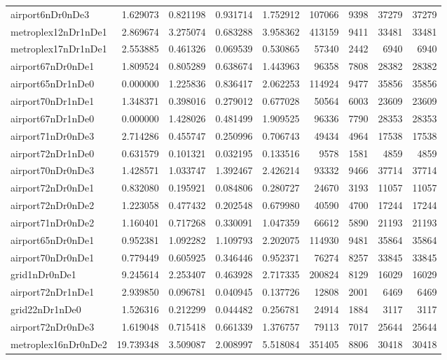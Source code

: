 \begin{longtable}{|l|r|r|r|r|r|r|r|r|}
airport6nDr0nDe3 & 1.629073 & 0.821198 & 0.931714 & 1.752912 & 107066 & 9398 & 37279 & 37279 \\
metroplex12nDr1nDe1 & 2.869674 & 3.275074 & 0.683288 & 3.958362 & 413159 & 9411 & 33481 & 33481 \\
metroplex17nDr1nDe1 & 2.553885 & 0.461326 & 0.069539 & 0.530865 & 57340 & 2442 & 6940 & 6940 \\
airport67nDr0nDe1 & 1.809524 & 0.805289 & 0.638674 & 1.443963 & 96358 & 7808 & 28382 & 28382 \\
airport65nDr1nDe0 & 0.000000 & 1.225836 & 0.836417 & 2.062253 & 114924 & 9477 & 35856 & 35856 \\
airport70nDr1nDe1 & 1.348371 & 0.398016 & 0.279012 & 0.677028 & 50564 & 6003 & 23609 & 23609 \\
airport67nDr1nDe0 & 0.000000 & 1.428026 & 0.481499 & 1.909525 & 96336 & 7790 & 28353 & 28353 \\
airport71nDr0nDe3 & 2.714286 & 0.455747 & 0.250996 & 0.706743 & 49434 & 4964 & 17538 & 17538 \\
airport72nDr1nDe0 & 0.631579 & 0.101321 & 0.032195 & 0.133516 & 9578 & 1581 & 4859 & 4859 \\
airport70nDr0nDe3 & 1.428571 & 1.033747 & 1.392467 & 2.426214 & 93332 & 9466 & 37714 & 37714 \\
airport72nDr0nDe1 & 0.832080 & 0.195921 & 0.084806 & 0.280727 & 24670 & 3193 & 11057 & 11057 \\
airport72nDr0nDe2 & 1.223058 & 0.477432 & 0.202548 & 0.679980 & 40590 & 4700 & 17244 & 17244 \\
airport71nDr0nDe2 & 1.160401 & 0.717268 & 0.330091 & 1.047359 & 66612 & 5890 & 21193 & 21193 \\
airport65nDr0nDe1 & 0.952381 & 1.092282 & 1.109793 & 2.202075 & 114930 & 9481 & 35864 & 35864 \\
airport70nDr0nDe1 & 0.779449 & 0.605925 & 0.346446 & 0.952371 & 76274 & 8257 & 33845 & 33845 \\
grid1nDr0nDe1 & 9.245614 & 2.253407 & 0.463928 & 2.717335 & 200824 & 8129 & 16029 & 16029 \\
airport72nDr1nDe1 & 2.939850 & 0.096781 & 0.040945 & 0.137726 & 12808 & 2001 & 6469 & 6469 \\
grid22nDr1nDe0 & 1.526316 & 0.212299 & 0.044482 & 0.256781 & 24914 & 1884 & 3117 & 3117 \\
airport72nDr0nDe3 & 1.619048 & 0.715418 & 0.661339 & 1.376757 & 79113 & 7017 & 25644 & 25644 \\
metroplex16nDr0nDe2 & 19.739348 & 3.509087 & 2.008997 & 5.518084 & 351405 & 8806 & 30418 & 30418 \\

\end{longtable}
